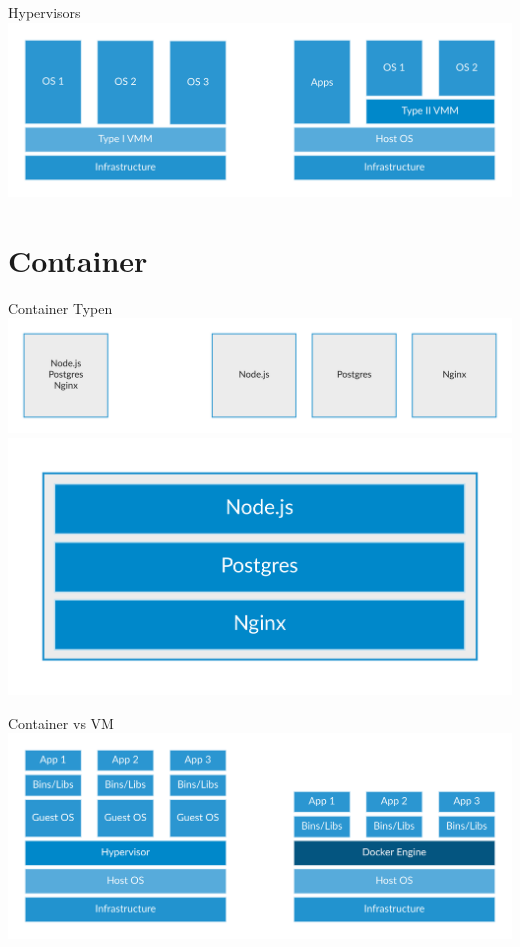 \documentclass[10pt]{beamer}
\begin{document}
\begin{frame}{Hypervisors}
  \includegraphics[width=1\textwidth]{../images/2-hypervisors.png}
\end{frame}

\section{Container}

\begin{frame}{Container Typen}
  \includegraphics[width=1\textwidth]{../images/4-os-specialized-containers.png}
  \includegraphics[width=1\textwidth]{../images/5-application-container.png}
\end{frame}

\begin{frame}{Container vs VM}
  \includegraphics[width=1\textwidth]{../images/6-container-vm.png}
\end{frame}
\end{document}
